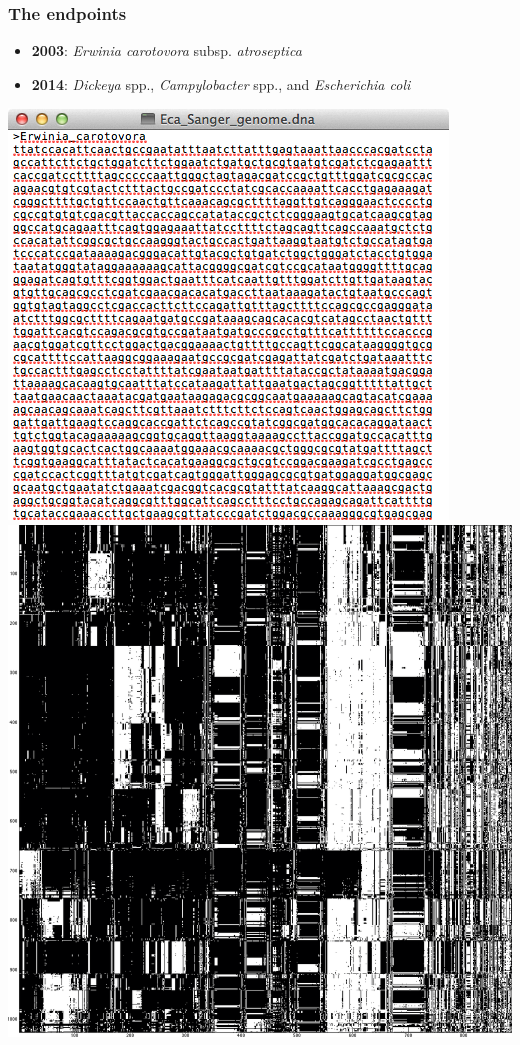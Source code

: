 \begin{frame}
  \frametitle{The endpoints}
  \begin{itemize}
    \item \textbf{2003}: \textit{Erwinia carotovora} subsp. \textit{atroseptica}
    \item \textbf{2014}: \textit{Dickeya} spp., \textit{Campylobacter} spp., and \textit{Escherichia coli}
  \end{itemize}
      \begin{center}
        \includegraphics[height=0.5\textheight]{images/pba_sequence}
        \includegraphics[width=0.5\textheight]{images/campy_presence_absence}
      \end{center}      
\end{frame}

